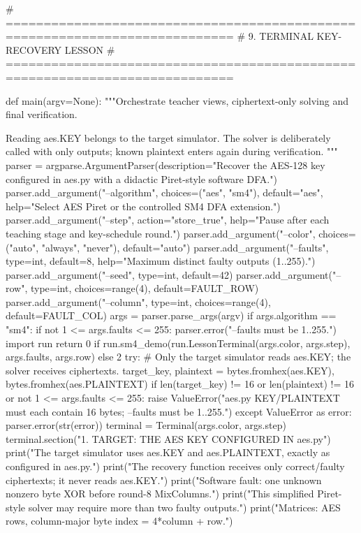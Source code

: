 \begin{lightcode}[numbers=left,firstnumber=1]
# ============================================================================
# 9. TERMINAL KEY-RECOVERY LESSON
# ============================================================================


def main(argv=None):
    """Orchestrate teacher views, ciphertext-only solving and final verification.

    Reading aes.KEY belongs to the target simulator. The solver is deliberately
    called with only outputs; known plaintext enters again during verification.
    """
    parser = argparse.ArgumentParser(description="Recover the AES-128 key configured in aes.py with a didactic Piret-style software DFA.")
    parser.add_argument("--algorithm", choices=("aes", "sm4"), default="aes", help="Select AES Piret or the controlled SM4 DFA extension.")
    parser.add_argument("--step", action="store_true", help="Pause after each teaching stage and key-schedule round.")
    parser.add_argument("--color", choices=("auto", "always", "never"), default="auto")
    parser.add_argument("--faults", type=int, default=8, help="Maximum distinct faulty outputs (1..255).")
    parser.add_argument("--seed", type=int, default=42)
    parser.add_argument("--row", type=int, choices=range(4), default=FAULT_ROW)
    parser.add_argument("--column", type=int, choices=range(4), default=FAULT_COL)
    args = parser.parse_args(argv)
    if args.algorithm == "sm4":
        if not 1 <= args.faults <= 255:
            parser.error("--faults must be 1..255.")
        import run
        return 0 if run.sm4_demo(run.LessonTerminal(args.color, args.step), args.faults, args.row) else 2
    try:
        # Only the target simulator reads aes.KEY; the solver receives ciphertexts.
        target_key, plaintext = bytes.fromhex(aes.KEY), bytes.fromhex(aes.PLAINTEXT)
        if len(target_key) != 16 or len(plaintext) != 16 or not 1 <= args.faults <= 255:
            raise ValueError("aes.py KEY/PLAINTEXT must each contain 16 bytes; --faults must be 1..255.")
    except ValueError as error:
        parser.error(str(error))
    terminal = Terminal(args.color, args.step)
    terminal.section("1. TARGET: THE AES KEY CONFIGURED IN aes.py")
    print("The target simulator uses aes.KEY and aes.PLAINTEXT, exactly as configured in aes.py.")
    print("The recovery function receives only correct/faulty ciphertexts; it never reads aes.KEY.")
    print("Software fault: one unknown nonzero byte XOR before round-8 MixColumns.")
    print("This simplified Piret-style solver may require more than two faulty outputs.")
    print("Matrices: AES rows, column-major byte index = 4*column + row.")

\end{lightcode}
